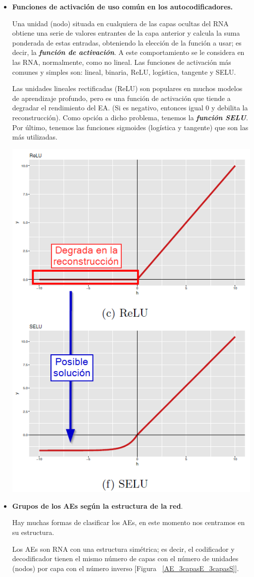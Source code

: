 \begin{enumerate}
\begin{itemize}
        \item \textbf{Funciones de activación de uso común en los autocodificadores.}
            \par Una unidad (nodo) situada en cualquiera de las capas ocultas del RNA obtiene una serie de valores entrantes de la capa anterior y calcula la suma ponderada de estas entradas, obteniendo la elección de la función a usar; es decir, la \textit{\textbf{función de activación}}. A este comportamiento se le considera en las RNA, normalmente, como no lineal.
            Las funciones de activación más comunes y simples son: lineal, binaria, ReLU, logística, tangente y SELU. 
            
            \smallskip
            Las unidades lineales rectificadas (ReLU) son populares en muchos modelos de aprendizaje profundo, pero es una función de activación que tiende a degradar el rendimiento del EA. (Si es negativo, entonces igual 0 y debilita la reconstrucción). Como opción a dicho problema, tenemos la \textit{\textbf{función SELU}}. Por último, tenemos las funciones sigmoides (logística y tangente) que son las más utilizadas.
            
            \begin{center}
                \includegraphics[width=.4\textwidth]{imagenes/Funciones_activacion_ReLU_SELU.png}
            \end{center}
            
        \item \textbf{Grupos de los AEs según la estructura de la red}.
        \par Hay muchas formas de clasificar los AEs, en este momento nos centramos en su estructura.
        
        Los AEs son RNA con una estructura simétrica; es decir, el codificador y decodificador tienen el mismo número de capas con el número de unidades (nodos) por capa con el número inverso [Figura ~\ref{AE_3capasE_3capasS}]. 
        

\end{itemize}
\end{enumerate}

